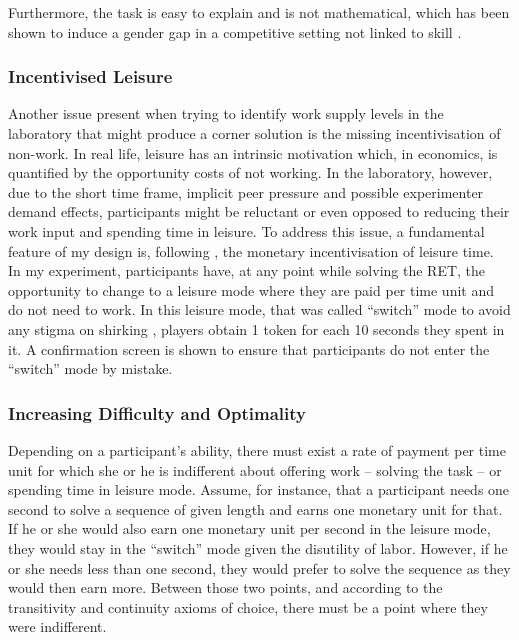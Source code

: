     Furthermore, the task is easy to explain and is not mathematical, which has been shown to induce a gender gap in a competitive setting not linked to skill \citep{niederle2010}.\\ 
    
    \subsubsection{Incentivised Leisure}
    \label{ss:switch_mode}
    
    Another issue present when trying to identify work supply levels in the laboratory that might produce a corner solution is the missing incentivisation of non-work. In real life, leisure has an intrinsic motivation which, in economics, is quantified by the opportunity costs of not working. In the laboratory, however, due to the short time frame, implicit peer pressure and possible experimenter demand effects, participants might be reluctant or even opposed to reducing their work input and spending time in leisure. To address this issue, a fundamental feature of my design is, following \citeauthor{sausgruberForthcoming}, the monetary incentivisation of leisure time.\\
    
    In my experiment, participants have, at any point while solving the RET, the opportunity to change to a leisure mode where they are paid per time unit and do not need to work. In this leisure mode, that was called ``switch'' mode to avoid any stigma on shirking \citep{rey-biel2016, eriksson2009}, players obtain 1 token for each 10 seconds they spent in it. A confirmation screen is shown to ensure that participants do not enter the ``switch'' mode by mistake.
    
    \subsubsection{Increasing Difficulty and Optimality}
    
    Depending on a participant's ability, there must exist a rate of payment per time unit for which she or he is indifferent about offering work -- solving the task -- or spending time in leisure mode. Assume, for instance, that a participant needs one second to solve a sequence of given length and earns one monetary unit for that. If he or she would also earn one monetary unit per second in the leisure mode, they would stay in the ``switch'' mode given the disutility of labor. However, if he or she needs less than one second, they would prefer to solve the sequence as they would then earn more. Between those two points, and according to the transitivity and continuity axioms of choice, there must be a point where they were indifferent.\\
    
